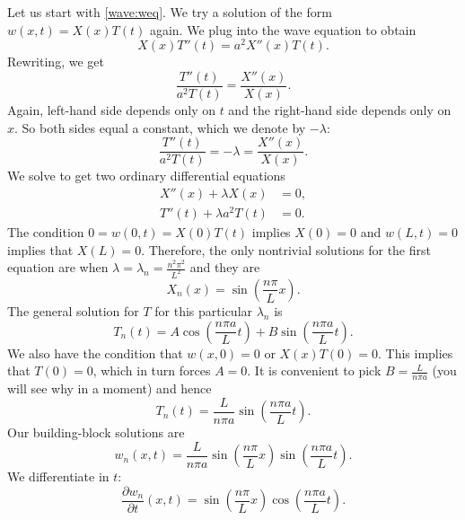 Let us start with \eqref{wave:weq}.
We try a solution of the form $w(x,t) = X(x) T(t)$ again.  We plug into
the wave equation to obtain
\begin{equation*}
X(x)T''(t) = a^2 X''(x) T(t) .
\end{equation*}
Rewriting, we get
\begin{equation*}
\frac{T''(t)}{a^2 T(t)} = \frac{X''(x)}{X(x)} .
\end{equation*}
Again, left-hand side depends only on $t$ and the right-hand side depends
only on $x$.  So both sides equal a constant, which we denote by
$-\lambda$:
\begin{equation*}
\frac{T''(t)}{a^2 T(t)} = -\lambda = \frac{X''(x)}{X(x)} .
\end{equation*}
We solve to get two ordinary differential equations
\begin{align*}
X''(x) + \lambda X(x) &= 0 , \\
T''(t) + \lambda a^2 T(t) &= 0 .
\end{align*}
The condition $0 = w(0,t) = X(0) T(t)$ implies $X(0) = 0$ and
$w(L,t) = 0$ implies that $X(L) = 0$.  Therefore, the only nontrivial
solutions for the first equation are when
$\lambda = \lambda_n = \frac{n^2 \pi^2}{L^2}$ and they are
\begin{equation*}
X_n(x) = \sin \left( \frac{n \pi}{L} x \right) .
\end{equation*}
The general solution for $T$ for this particular $\lambda_n$ is
\begin{equation*}
T_n(t) = A \cos \left( \frac{n \pi a}{L} t \right)
+ B \sin \left( \frac{n \pi a}{L} t \right).
\end{equation*}
We also have the condition that $w(x,0) = 0$ or $X(x)T(0) = 0$.  This
implies that $T(0) = 0$, which in turn forces $A = 0$.  It is
convenient to pick $B=\frac{L}{n \pi a}$ (you will see why in a moment)
and hence
\begin{equation*}
T_n(t) = \frac{L}{n \pi a} \sin \left( \frac{n \pi a}{L} t \right).
\end{equation*}
Our building-block solutions are
\begin{equation*}
w_n(x,t) = 
\frac{L}{n \pi a} 
\sin \left( \frac{n \pi}{L} x \right)
\sin \left( \frac{n \pi a}{L} t \right) .
\end{equation*}
We differentiate in $t$:
\begin{equation*}
\frac{\partial w_n}{\partial t}(x,t) = 
\sin \left( \frac{n \pi}{L} x \right)
\cos \left( \frac{n \pi a}{L} t \right) .
\end{equation*}
